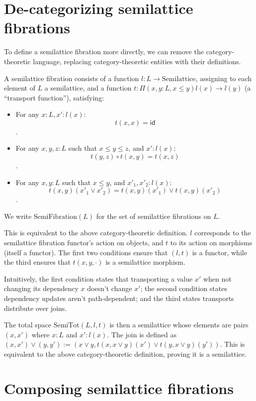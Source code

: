 \documentclass{article}
\begin{document}
    \section{De-categorizing semilattice fibrations}

      To define a semilattice fibration more directly, we can remove the category-theoretic language, replacing category-theoretic entities with their definitions.

      A semilattice fibration consists of a function $l : L \rightarrow \mathrm{Semilattice}$, assigning to each element of $L$ a semilattice, and a function $t : \Pi (x, y : L, x \leq y) l(x) \rightarrow l(y)$ (a ``transport function''), satisfying:

      \begin{itemize}
        \item For any $x : L, x' : l(x)$: $$t(x, x) = \mathsf{id}$$.
        \item For any $x, y, z : L$ such that $x \leq y \leq z$, and $x' : l(x)$: $$t(y, z) \circ t(x, y) = t(x, z)$$.
        \item For any $x, y : L$ such that $x \leq y$, and $x'_1, x'_2 : l(x)$: $$t(x, y)(x'_1 \vee x'_2) = t(x, y)(x'_1) \vee t(x, y)(x'_2)$$.
      \end{itemize}

      We write $\mathrm{SemiFibration}(L)$ for the set of semilattice fibrations on $L$.

      This is equivalent to the above category-theoretic definition. $l$ corresponds to the semilattice fibration functor's action on objects, and $t$ to its action on morphisms (itself a functor). The first two conditions ensure that $(l, t)$ is a functor, while the third ensures that $t(x, y, \cdot)$ is a semilattice morphism.

      Intuitively, the first condition states that transporting a value $x'$ when not changing its dependency $x$ doesn't change $x'$; the second condition states dependency updates aren't path-dependent; and the third states transports distribute over joins.

      The total space $\mathrm{SemiTot}(L, l, t)$ is then a semilattice whose elements are pairs $(x, x')$ where $x : L$ and $x' : l(x)$. The join is defined as $(x, x') \vee (y, y') := (x \vee y, t(x, x \vee y)(x') \vee t(y, x \vee y)(y'))$. This is equivalent to the above category-theoretic definition, proving it is a semilattice.

    \section{Composing semilattice fibrations}
\end{document}
